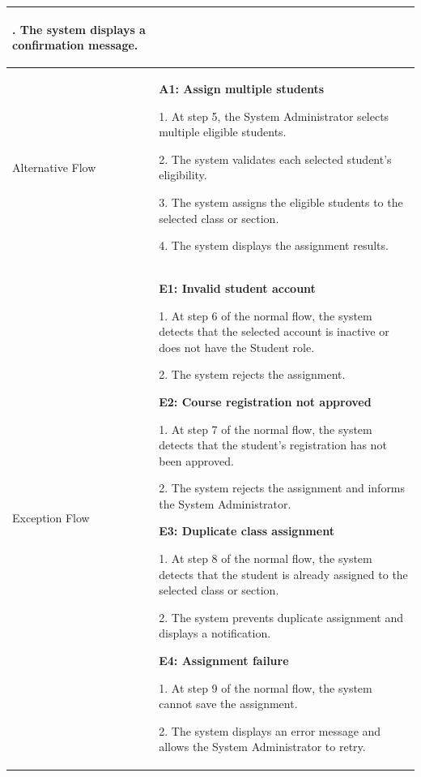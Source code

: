 \begin{longtable}{|>{\bfseries\raggedright\arraybackslash}p{}|>{\raggedright\arraybackslash}p{}|}
10. The system displays a confirmation message. \\ \hline
Alternative Flow &
\textbf{A1: Assign multiple students} \par
1. At step 5, the System Administrator selects multiple eligible students. \par
2. The system validates each selected student's eligibility. \par
3. The system assigns the eligible students to the selected class or section. \par
4. The system displays the assignment results. \\ \hline
Exception Flow &
\textbf{E1: Invalid student account} \par
1. At step 6 of the normal flow, the system detects that the selected account is inactive or does not have the Student role. \par
2. The system rejects the assignment. \par\vspace{4pt}
\textbf{E2: Course registration not approved} \par
1. At step 7 of the normal flow, the system detects that the student's registration has not been approved. \par
2. The system rejects the assignment and informs the System Administrator. \par\vspace{4pt}
\textbf{E3: Duplicate class assignment} \par
1. At step 8 of the normal flow, the system detects that the student is already assigned to the selected class or section. \par
2. The system prevents duplicate assignment and displays a notification. \par\vspace{4pt}
\textbf{E4: Assignment failure} \par
1. At step 9 of the normal flow, the system cannot save the assignment. \par
2. The system displays an error message and allows the System Administrator to retry. \\ \hline
\end{longtable}


